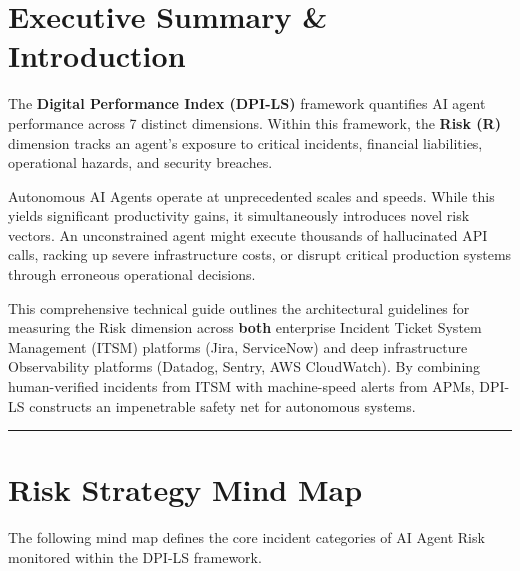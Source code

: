 \documentclass[11pt,a4paper]{article}
\begin{document}
\tableofcontents
\newpage

\section{Executive Summary \& Introduction}

\begin{dpinote}
The \textbf{Digital Performance Index (DPI-LS)} framework quantifies AI agent performance across 7 distinct dimensions. Within this framework, the \textbf{Risk (R)} dimension tracks an agent's exposure to critical incidents, financial liabilities, operational hazards, and security breaches.
\end{dpinote}

Autonomous AI Agents operate at unprecedented scales and speeds. While this yields significant productivity gains, it simultaneously introduces novel risk vectors. An unconstrained agent might execute thousands of hallucinated API calls, racking up severe infrastructure costs, or disrupt critical production systems through erroneous operational decisions. 

This comprehensive technical guide outlines the architectural guidelines for measuring the Risk dimension across \textbf{both} enterprise Incident Ticket System Management (ITSM) platforms (Jira, ServiceNow) and deep infrastructure Observability platforms (Datadog, Sentry, AWS CloudWatch). By combining human-verified incidents from ITSM with machine-speed alerts from APMs, DPI-LS constructs an impenetrable safety net for autonomous systems.

\vspace{0.5cm}
\hrule
\vspace{0.5cm}

\section{Risk Strategy Mind Map}

The following mind map defines the core incident categories of AI Agent Risk monitored within the DPI-LS framework.
\end{document}
